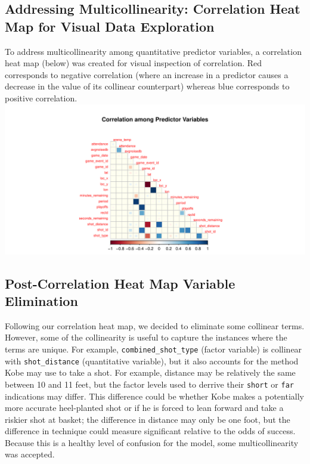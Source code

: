 \documentclass[american,]{article}
\begin{document}
\hypertarget{addressing-multicollinearity-correlation-heat-map-for-visual-data-exploration}{%
\subsection{\texorpdfstring{\textbf{Addressing Multicollinearity: Correlation Heat Map for Visual Data Exploration}}{Addressing Multicollinearity: Correlation Heat Map for Visual Data Exploration}}\label{addressing-multicollinearity-correlation-heat-map-for-visual-data-exploration}}

To address multicollinearity among quantitative predictor variables, a correlation heat map (below) was created for visual inspection of correlation. Red corresponds to negative correlation (where an increase in a predictor causes a decrease in the value of its collinear counterpart) whereas blue corresponds to positive correlation.
\includegraphics{Final_Project_Applied_files/figure-latex/Multicollinearity-1.pdf}

\hypertarget{post-correlation-heat-map-variable-elimination}{%
\subsection{\texorpdfstring{\textbf{Post-Correlation Heat Map Variable Elimination}}{Post-Correlation Heat Map Variable Elimination}}\label{post-correlation-heat-map-variable-elimination}}

Following our correlation heat map, we decided to eliminate some collinear terms. However, some of the collinearity is useful to capture the instances where the terms are unique. For example, \texttt{combined\_shot\_type} (factor variable) is collinear with \texttt{shot\_distance} (quantitative variable), but it also accounts for the method Kobe may use to take a shot. For example, distance may be relatively the same between 10 and 11 feet, but the factor levels used to derrive their \texttt{short} or \texttt{far} indications may differ. This difference could be whether Kobe makes a potentially more accurate heel-planted shot or if he is forced to lean forward and take a riskier shot at basket; the difference in distance may only be one foot, but the difference in technique could measure significant relative to the odds of success. Because this is a healthy level of confusion for the model, some multicollinearity was accepted.
\end{document}

